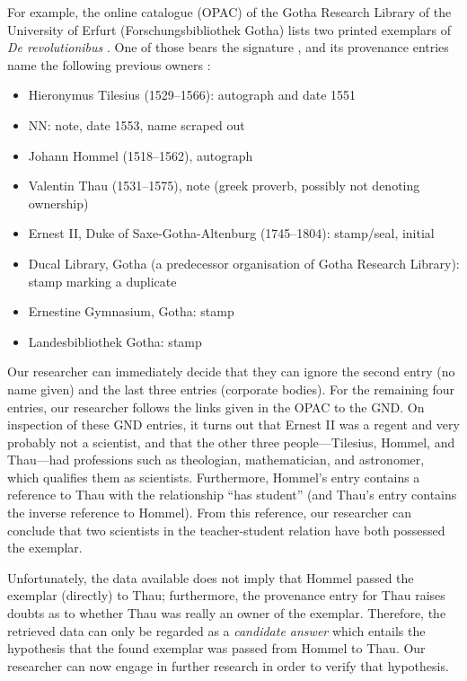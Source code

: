 For example, the online catalogue (OPAC) of the Gotha Research Library of the University of Erfurt (Forschungsbibliothek Gotha) lists two printed exemplars
of \emph{De revolutionibus} \autocite{OPACDeRev}.
One of those bears the signature , and its provenance entries name the following previous owners  \autocite{OPACDeRevPPN}:
%
\begin{itemize}
  \item
    Hieronymus Tilesius (1529–1566): autograph and date 1551
  \item
    NN: note, date 1553, name scraped out
  \item
    Johann Hommel (1518–1562), autograph
  \item
    Valentin Thau (1531–1575), note (greek proverb, possibly not denoting ownership)
  \item
    Ernest II, Duke of Saxe-Gotha-Altenburg (1745–1804): stamp/seal, initial
  \item
    Ducal Library, Gotha (a predecessor organisation of Gotha Research Library): stamp marking a duplicate
  \item
    Ernestine Gymnasium, Gotha: stamp
  \item
    Landesbibliothek Gotha: stamp
\end{itemize}
%
Our researcher can immediately decide that they can ignore the second entry (no name given) and the last three entries (corporate bodies).
For the remaining four entries, our researcher follows the links given in the OPAC to the \gls{GND}.
On inspection of these \gls{GND} entries, it turns out that Ernest II was a regent and very probably not a scientist,
and that the other three people---Tilesius, Hommel, and Thau---had professions such as theologian,
mathematician, and astronomer, which qualifies them as scientists. Furthermore, Hommel's entry
contains a reference to Thau with the relationship \enquote{has student}
(and Thau's entry contains the inverse reference to Hommel).
From this reference, our researcher can conclude that two scientists in the teacher-student relation
have both possessed the exemplar. 

Unfortunately, the data available does not imply that Hommel passed the exemplar (directly) to Thau;
furthermore, the provenance entry for Thau raises doubts as to whether Thau was really an owner of the exemplar.
Therefore, the retrieved data can only be regarded as a \emph{candidate answer}
which entails the hypothesis that the found exemplar was passed from Hommel to Thau.
Our researcher can now engage in further research in order to verify that hypothesis.

